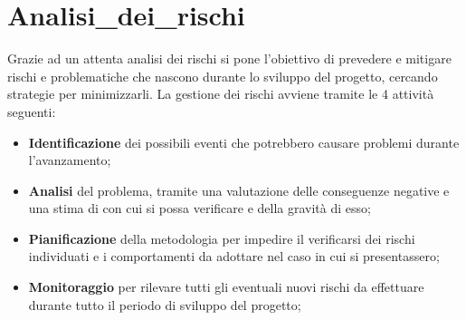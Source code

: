 \section{Analisi_dei_rischi}

Grazie ad un attenta analisi dei rischi si pone l'obiettivo di prevedere e mitigare rischi e problematiche che nascono durante lo sviluppo del progetto, cercando strategie per minimizzarli. 
La gestione dei rischi avviene tramite le 4 attività seguenti:
\begin{itemize}
	\item \textbf{Identificazione} dei possibili eventi che potrebbero causare problemi durante l'avanzamento;
	\item \textbf{Analisi} del problema, tramite una valutazione delle conseguenze negative e una stima di con cui si possa verificare e della gravità di esso;
	\item \textbf{Pianificazione} della metodologia per impedire il verificarsi dei rischi individuati e i comportamenti da adottare nel caso in cui si presentassero;
	\item \textbf{Monitoraggio} per rilevare tutti gli eventuali nuovi rischi da effettuare durante tutto il periodo di sviluppo del progetto;
\end{itemize}

